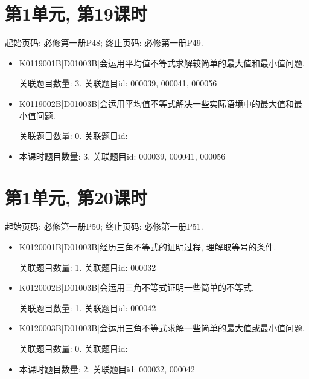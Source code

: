\section*{第1单元, 第19课时}
起始页码: 必修第一册P48; 终止页码: 必修第一册P49.
\begin{itemize}
\item K0119001B|D01003B|会运用平均值不等式求解较简单的最大值和最小值问题.

关联题目数量: 3. 关联题目id: 000039, 000041, 000056

\item K0119002B|D01003B|会运用平均值不等式解决一些实际语境中的最大值和最小值问题.

关联题目数量: 0. 关联题目id: 

\item 本课时题目数量: 3. 关联题目id: 000039, 000041, 000056

\end{itemize}

\section*{第1单元, 第20课时}
起始页码: 必修第一册P50; 终止页码: 必修第一册P51.
\begin{itemize}
\item K0120001B|D01003B|经历三角不等式的证明过程, 理解取等号的条件.

关联题目数量: 1. 关联题目id: 000032

\item K0120002B|D01003B|会运用三角不等式证明一些简单的不等式.

关联题目数量: 1. 关联题目id: 000042

\item K0120003B|D01003B|会运用三角不等式求解一些简单的最大值或最小值问题.

关联题目数量: 0. 关联题目id: 

\item 本课时题目数量: 2. 关联题目id: 000032, 000042

\end{itemize}

